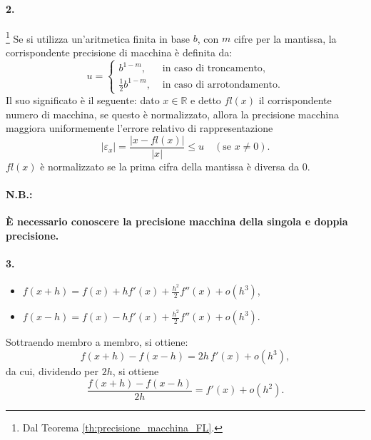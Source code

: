 \paragraph{2.} \footnote{Dal Teorema \ref{th:precisione_macchina_FL}.} Se si utilizza un'aritmetica finita in base $b$, con $m$ cifre per la mantissa, la corrispondente precisione di macchina è definita da:
\begin{equation*}
	u=
	\begin{cases}
		b^{1-m}, &\text{ in caso di troncamento},\\
		\frac{1}{2}b^{1-m}, &\text{ in caso di arrotondamento}.
	\end{cases}
\end{equation*}
Il suo significato è il seguente: dato $x\in\mathbb R$ e detto $fl(x)$ il corrispondente numero di macchina, se questo è normalizzato, allora la precisione macchina \gls{maggiora uniformemente} l'errore relativo di rappresentazione
\begin{equation*}
	|\varepsilon_x| = \frac{|x-fl(x)|}{|x|}\leq u\quad (\text{se } x\neq 0).
\end{equation*}
$fl(x)$ è normalizzato se la prima cifra della mantissa è diversa da 0.

\paragraph{N.B.:} \textbf{È necessario conoscere la precisione macchina della singola e doppia precisione.}

\paragraph{3.}
\begin{itemize}
	\item $f(x+h)=f(x)+hf'(x)+\frac{h^2}{2}f''(x)+o(h^3)$,
	\item $f(x-h)=f(x)-hf'(x)+\frac{h^2}{2}f''(x)+o(h^3)$.
\end{itemize}
Sottraendo membro a membro, si ottiene:
\begin{equation*}
	f(x+h)-f(x-h)=2h\,f'(x)+o(h^3),
\end{equation*}
da cui, dividendo per $2h$, si ottiene
\begin{equation*}
	\frac{f(x+h)-f(x-h)}{2h}=f'(x)+o(h^2).
\end{equation*}

